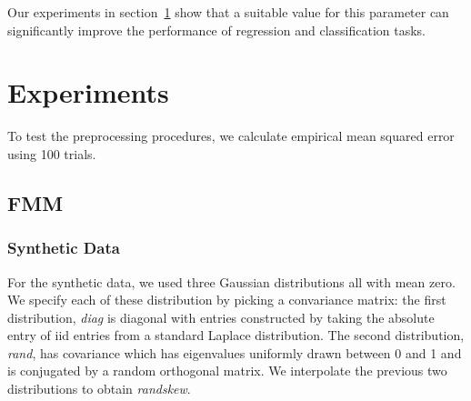\documentclass{article}
\theoremstyle{definition}
\theoremstyle{plain}
\newcommand{\X}{\mathbf{X}}
\newcommand{\W}{\mathbf{W}}
\begin{document}



Our experiments in section~\ref{sec:experiments} show that a suitable value for this parameter can significantly improve the performance of regression and classification tasks.


\section{Experiments}\label{sec:experiments}
To test the preprocessing procedures, we calculate empirical mean squared error using 100 trials. 

\subsection*{FMM}
\subsubsection*{Synthetic Data}
For the synthetic data, we used three Gaussian distributions all with mean zero. We specify each of these distribution by picking a convariance matrix: the first distribution, \emph{diag} is diagonal with entries constructed by taking the absolute entry of iid entries from a standard Laplace distribution. The second distribution, \emph{rand},  has covariance which has eigenvalues uniformly drawn between 0 and 1 and is conjugated by a random orthogonal matrix. We interpolate the previous two distributions to obtain \emph{randskew}. 
\end{document}

